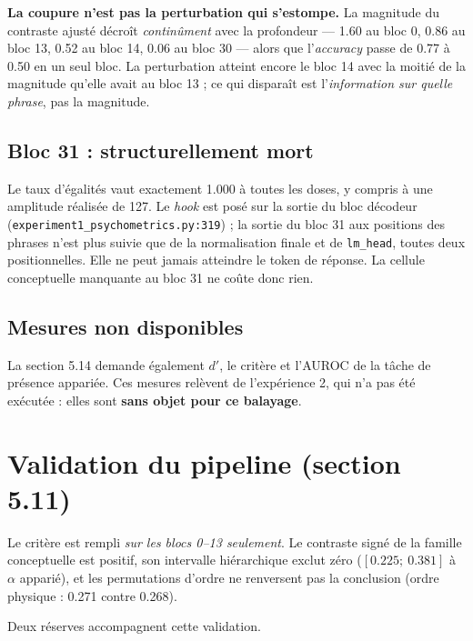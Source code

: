 \documentclass[11pt,a4paper]{article}
\newcommand{\code}[1]{\texttt{\small #1}}
\begin{document}
\noindent
\textbf{La coupure n'est pas la perturbation qui s'estompe.} La magnitude du contraste
ajusté décroît \emph{continûment} avec la profondeur --- \num{1.60} au bloc 0, \num{0.86}
au bloc 13, \num{0.52} au bloc 14, \num{0.06} au bloc 30 --- alors que l'\emph{accuracy}
passe de \num{0.77} à \num{0.50} en un seul bloc. La perturbation atteint encore le bloc
14 avec la moitié de la magnitude qu'elle avait au bloc 13 ; ce qui disparaît est
l'\emph{information sur quelle phrase}, pas la magnitude.

\subsection{Bloc 31 : structurellement mort}
\label{sec:block31}

Le taux d'égalités vaut exactement \num{1.000} à toutes les doses, y compris à une
amplitude réalisée de \num{127}. Le \emph{hook} est posé sur la sortie du bloc décodeur
(\code{experiment1\_psychometrics.py:319}) ; la sortie du bloc 31 aux positions des
phrases n'est plus suivie que de la normalisation finale et de \code{lm\_head}, toutes
deux positionnelles. Elle ne peut jamais atteindre le token de réponse. La cellule
conceptuelle manquante au bloc 31 ne coûte donc rien.

\subsection{Mesures non disponibles}

La section 5.14 demande également $d'$, le critère et l'AUROC de la tâche de présence
appariée. Ces mesures relèvent de l'expérience 2, qui n'a pas été exécutée : elles sont
\textbf{sans objet pour ce balayage}.

\section{Validation du pipeline (section 5.11)}

Le critère est rempli \emph{sur les blocs 0--13 seulement}. Le contraste signé de la
famille conceptuelle est positif, son intervalle hiérarchique exclut zéro
($[\num{0.225};\ \num{0.381}]$ à $\alpha$ apparié), et les permutations d'ordre ne
renversent pas la conclusion (ordre physique : \num{0.271} contre \num{0.268}).

Deux réserves accompagnent cette validation.
\end{document}
